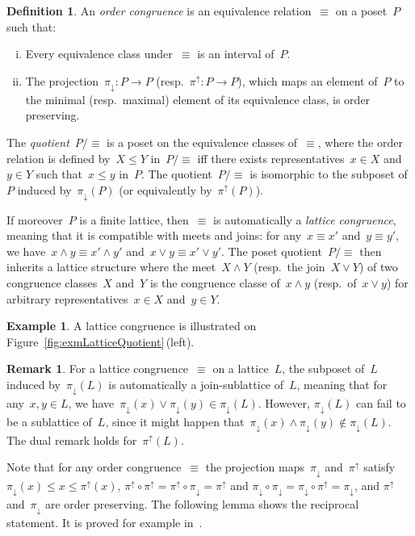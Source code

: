 \documentclass{memo-l}
\theoremstyle{definition}
\newtheorem{definition}[theorem]{Definition}
\newtheorem{example}[theorem]{Example}
\newtheorem{remark}[theorem]{Remark}
\newcommand{\fref}[1]{Figure~\ref{#1}} %
\newcommand{\darkblue}{\color{darkblue}} %
\newcommand{\defn}[1]{\textsl{\darkblue #1}} %
\newcommand{\meet}{\wedge} %
\newcommand{\join}{\vee} %
\newcommand{\projDown}{\pi_\downarrow} %
\newcommand{\projUp}{\pi^\uparrow} %
\begin{document}
\begin{definition}
An \defn{order congruence} is an equivalence relation~$\equiv$ on a poset~$P$ such that:
\begin{enumerate}[(i)]
\item Every equivalence class under~$\equiv$ is an interval of~$P$.
\item The projection~$\projDown : P \to P$ (resp.~$\projUp : P \to P$), which maps an element of~$P$ to the minimal (resp.~maximal) element of its equivalence class, is order preserving.
\end{enumerate}
The \defn{quotient}~$P/{\equiv}$ is a poset on the equivalence classes of~$\equiv$, where the order relation is defined by~$X \le Y$ in~$P/{\equiv}$ iff there exists representatives~$x \in X$ and~$y \in Y$ such that~$x \le y$ in~$P$. The quotient~$P/{\equiv}$ is isomorphic to the subposet of~$P$ induced by~$\projDown(P)$ (or equivalently by~$\projUp(P)$).

If moreover~$P$ is a finite lattice, then~$\equiv$ is automatically a \defn{lattice congruence}, meaning that it is compatible with meets and joins: for any~$x \equiv x'$ and~$y \equiv y'$, we have~$x \meet y \equiv x' \meet y'$ and~$x \join y \equiv x' \join y'$. The poset quotient~$P/{\equiv}$ then inherits a lattice structure where the meet~$X \meet Y$ (resp.~the join~$X \join Y$) of two congruence classes~$X$ and~$Y$ is the congruence classe of~$x \meet y$ (resp.~of~$x \join y$) for arbitrary representatives~$x \in X$ and~$y \in Y$.
\end{definition}

\begin{example}
A lattice congruence is illustrated on \fref{fig:exmLatticeQuotient}\,(left).
\end{example}

\begin{remark}
\label{rem:sublattice}
For a lattice congruence~$\equiv$ on a lattice~$L$, the subposet of~$L$ induced by~$\projDown(L)$ is automatically a join-sublattice of~$L$, meaning that for any~${x,y \in L}$, we have~${\projDown(x) \join \projDown(y) \in \projDown(L)}$.
However, $\projDown(L)$ can fail to be a sublattice of~$L$, since it might happen that~$\projDown(x) \meet \projDown(y) \notin \projDown(L)$.
The dual remark holds for~$\projUp(L)$.
\end{remark}

Note that for any order congruence~$\equiv$ the projection maps~$\projDown$ and~$\projUp$ satisfy~${\projDown(x) \le x \le \projUp(x)}$, ${\projUp \circ \projUp = \projUp \circ \projDown = \projUp}$ and ${\projDown \circ \projDown = \projDown \circ \projUp = \projDown}$, and $\projUp$ and~$\projDown$ are order preserving.
The following lemma shows the reciprocal statement.
It is proved for example in~\cite[Lem.~4.2]{DermenjianHohlwegPilaud}.
\end{document}
